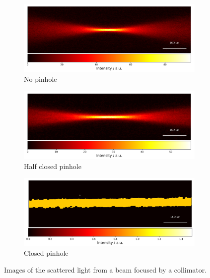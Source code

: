 \begin{figure}[ht]
    \centering
    \begin{subfigure}{0.95\linewidth}
      \includegraphics[width=\linewidth]{data/lightsheetCharacterization/NoPinhole/LSC_nopinhole_40ms_100_1/LSNiPinhole.pdf}
      \caption{No pinhole}
      \label{fig:subfig1}
    \end{subfigure}

    \begin{subfigure}{0.95\linewidth}
      \includegraphics[width=\linewidth]{data/lightsheetCharacterization/HalfClosedPinhole/LSC_halfclosedpinhole_40ms_100_1/LSHalfPinhole.pdf}
      \caption{Half closed pinhole}
      \label{fig:subfig2}
    \end{subfigure}

    \begin{subfigure}{0.95\linewidth}
      \includegraphics[width=\linewidth]{data/lightsheetCharacterization/ClosedPinhole/LSC_closedpinhole_40ms_2_7A_1/LSPinhole.pdf}
      \caption{Closed pinhole}
      \label{fig:subfig3}
    \end{subfigure}

    \caption{Images of the scattered light from a beam focused by a collimator. }
    \label{fig:subfigureBeamshape}
\end{figure}

